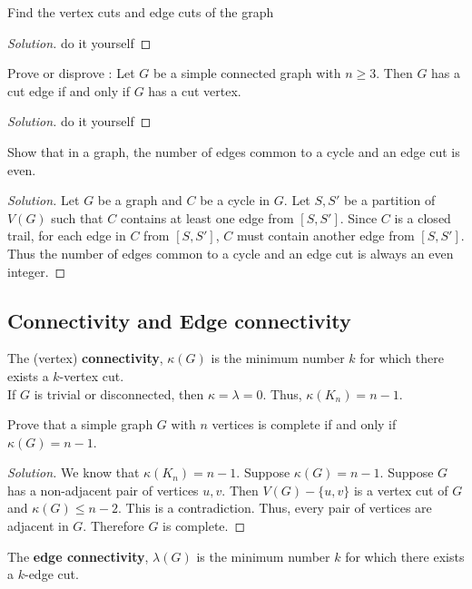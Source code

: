 \begin{exercise}
	Find the vertex cuts and edge cuts of the graph
\end{exercise}
\begin{proof}[Solution]
	do it yourself
\end{proof}

\begin{exercise}
	Prove or disprove : Let $G$ be a simple connected graph with $n \ge 3$. Then $G$ has a cut edge if and only if $G$ has a cut vertex.
\end{exercise}
\begin{proof}[Solution]
	do it yourself
\end{proof}

\begin{exercise}
	Show that in a graph, the number of edges common to a cycle and an edge cut is even.
\end{exercise}
\begin{proof}[Solution]
	Let $G$ be a graph and $C$ be a cycle in $G$. Let $S,S'$ be a partition of $V(G)$ such that $C$ contains at least one edge from $[S,S']$. Since $C$ is a closed trail, for each edge in $C$ from $[S,S']$, $C$ must contain another edge from $[S,S']$. Thus the number of edges common to a cycle and an edge cut is always an even integer.
\end{proof}

\subsection{Connectivity and Edge connectivity}
\begin{definition}
	The (vertex) \textbf{connectivity}, $\kappa(G)$ is the minimum number $k$ for which there exists a $k$-vertex cut.\\

	If $G$ is trivial or disconnected, then $\kappa = \lambda = 0$. Thus, $\kappa(K_n) = n-1$.
\end{definition}

\begin{exercise}
	Prove that a simple graph $G$ with $n$ vertices is complete if and only if $\kappa(G) = n-1$.
\end{exercise}
\begin{proof}[Solution]
	We know that $\kappa(K_n) = n-1$. Suppose $\kappa(G) = n-1$. Suppose $G$ has a non-adjacent pair of vertices $u,v$. Then $V(G)-\{u,v\}$ is a vertex cut of $G$ and $\kappa(G) \le n-2$. This is a contradiction. Thus, every pair of vertices are adjacent in $G$. Therefore $G$ is complete.
\end{proof}
\begin{definition}
	The \textbf{edge connectivity}, $\lambda(G)$ is the minimum number $k$ for which there exists a $k$-edge cut.
\end{definition}


